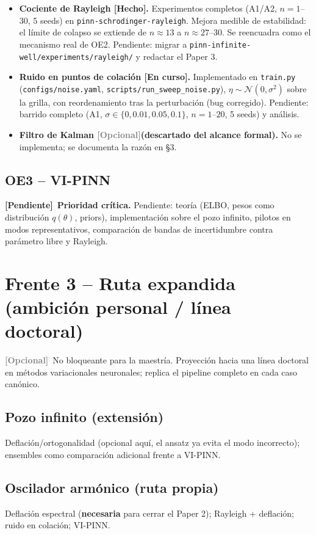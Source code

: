 \documentclass[11pt]{article}
\newcommand{\done}{\textcolor{green!50!black}{\textbf{[Hecho]}}}
\newcommand{\pending}{\textcolor{red!70!black}{\textbf{[Pendiente]}}}
\newcommand{\progress}{\textcolor{blue!60!black}{\textbf{[En curso]}}}
\newcommand{\optional}{\textcolor{gray}{\textbf{[Opcional]}}}
\begin{document}
\begin{itemize}
    \item \textbf{Cociente de Rayleigh \done.} Experimentos completos (A1/A2,
    $n=1$--$30$, 5 seeds) en \texttt{pinn-schrodinger-rayleigh}. Mejora medible de
    estabilidad: el límite de colapso se extiende de $n\approx13$ a $n\approx27$--$30$.
    Se reencuadra como el mecanismo real de OE2. Pendiente: migrar a
    \texttt{pinn-infinite-well/experiments/rayleigh/} y redactar el Paper 3.
    \item \textbf{Ruido en puntos de colación \progress.} Implementado en
    \texttt{train.py} (\texttt{configs/noise.yaml},
    \texttt{scripts/run\_sweep\_noise.py}), $\eta\sim\mathcal{N}(0,\sigma^2)$ sobre la
    grilla, con reordenamiento tras la perturbación (bug corregido). Pendiente:
    barrido completo (A1, $\sigma\in\{0, 0.01, 0.05, 0.1\}$, $n=1$--$20$, 5 seeds) y
    análisis.
    \item \textbf{Filtro de Kalman \optional (descartado del alcance formal).} No
    se implementa; se documenta la razón en \S3.
\end{itemize}

\subsection{OE3 -- VI-PINN}

\pending\ \textbf{Prioridad crítica.} Pendiente: teoría (ELBO, pesos como
distribución $q(\theta)$, priors), implementación sobre el pozo infinito, pilotos en
modos representativos, comparación de bandas de incertidumbre contra parámetro libre
y Rayleigh.

\section{Frente 3 -- Ruta expandida (ambición personal / línea doctoral)}

\optional\ No bloqueante para la maestría. Proyección hacia una línea doctoral en
métodos variacionales neuronales; replica el pipeline completo en cada caso canónico.

\subsection{Pozo infinito (extensión)}
Deflación/ortogonalidad (opcional aquí, el ansatz ya evita el modo incorrecto);
ensembles como comparación adicional frente a VI-PINN.

\subsection{Oscilador armónico (ruta propia)}
Deflación espectral (\textbf{necesaria} para cerrar el Paper 2); Rayleigh +
deflación; ruido en colación; VI-PINN.
\end{document}
